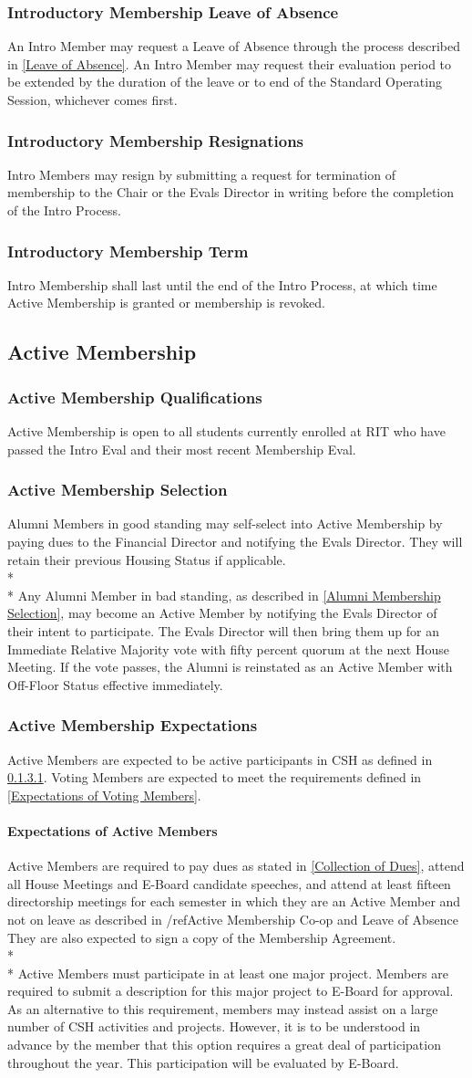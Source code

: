 \documentclass{article}
\newcommand{\asection}[1]{\subsection{#1} \label{#1}}
\newcommand{\asubsection}[1]{\subsubsection{#1} \label{#1}}
\newcommand{\asubsubsection}[1]{\paragraph{#1} \label{#1}}
\begin{document}
\asubsection{Introductory Membership Leave of Absence}
An Intro Member may request a Leave of Absence through the process described in \ref{Leave of Absence}.
An Intro Member may request their evaluation period to be extended by the duration of the leave or to end of the Standard Operating Session, whichever comes first.

\asubsection{Introductory Membership Resignations}
Intro Members may resign by submitting a request for termination of membership to the Chair or the Evals Director in writing before the completion of the Intro Process.

\asubsection{Introductory Membership Term}
Intro Membership shall last until the end of the Intro Process, at which time Active Membership is granted or membership is revoked.

\asection{Active Membership}

\asubsection{Active Membership Qualifications}
Active Membership is open to all students currently enrolled at RIT who have passed the Intro Eval and their most recent Membership Eval.

\asubsection{Active Membership Selection}
Alumni Members in good standing may self-select into Active Membership by paying dues to the Financial Director and notifying the Evals Director. They will retain their previous Housing Status if applicable.
\\*\\*
Any Alumni Member in bad standing, as described in \ref{Alumni Membership Selection}, may become an Active Member by notifying the Evals Director of their intent to participate.
The Evals Director will then bring them up for an Immediate Relative Majority vote with fifty percent quorum at the next House Meeting.
If the vote passes, the Alumni is reinstated as an Active Member with Off-Floor Status effective immediately.

\asubsection{Active Membership Expectations}
Active Members are expected to be active participants in CSH as defined in \ref{Expectations of Active Members}.
Voting Members are expected to meet the requirements defined in \ref{Expectations of Voting Members}.

\asubsubsection{Expectations of Active Members}
Active Members are required to pay dues as stated in \ref{Collection of Dues}, attend all House Meetings and E-Board candidate speeches, and attend at least fifteen directorship meetings for each semester in which they are an Active Member and not on leave as described in /ref{Active Membership Co-op and Leave of Absence}
They are also expected to sign a copy of the Membership Agreement.
\\* \\*
Active Members must participate in at least one major project.
Members are required to submit a description for this major project to E-Board for approval.
As an alternative to this requirement, members may instead assist on a large number of CSH activities and projects.
However, it is to be understood in advance by the member that this option requires a great deal of participation throughout the year.
This participation will be evaluated by E-Board.
\end{document}
